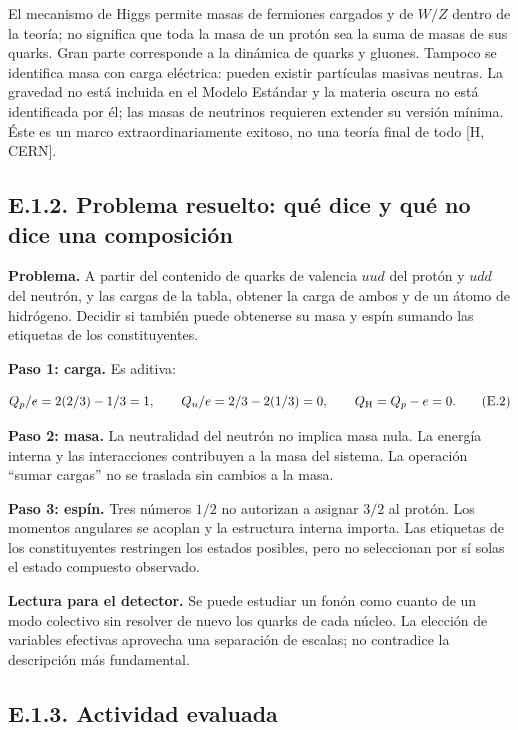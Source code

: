 \documentclass[
  spanish,
  10pt,
  a4paper,
]{article}
\begin{document}
El mecanismo de Higgs permite masas de fermiones cargados y de \(W/Z\)
dentro de la teoría; no significa que toda la masa de un protón sea la
suma de masas de sus quarks. Gran parte corresponde a la dinámica de
quarks y gluones. Tampoco se identifica masa con carga eléctrica: pueden
existir partículas masivas neutras. La gravedad no está incluida en el
Modelo Estándar y la materia oscura no está identificada por él; las
masas de neutrinos requieren extender su versión mínima. Éste es un
marco extraordinariamente exitoso, no una teoría final de todo {[}H,
CERN{]}.

\subsection{E.1.2. Problema resuelto: qué dice y qué no dice una
composición}\label{e.1.2.-problema-resuelto-quuxe9-dice-y-quuxe9-no-dice-una-composiciuxf3n}

\textbf{Problema.} A partir del contenido de quarks de valencia \(uud\)
del protón y \(udd\) del neutrón, y las cargas de la tabla, obtener la
carga de ambos y de un átomo de hidrógeno. Decidir si también puede
obtenerse su masa y espín sumando las etiquetas de los constituyentes.

\textbf{Paso 1: carga.} Es aditiva:

\[
Q_p/e=2(2/3)-1/3=1,\qquad
Q_n/e=2/3-2(1/3)=0,\qquad
Q_{\rm H}=Q_p-e=0.
\tag{E.2}
\]

\textbf{Paso 2: masa.} La neutralidad del neutrón no implica masa nula.
La energía interna y las interacciones contribuyen a la masa del
sistema. La operación ``sumar cargas'' no se traslada sin cambios a la
masa.

\textbf{Paso 3: espín.} Tres números \(1/2\) no autorizan a asignar
\(3/2\) al protón. Los momentos angulares se acoplan y la estructura
interna importa. Las etiquetas de los constituyentes restringen los
estados posibles, pero no seleccionan por sí solas el estado compuesto
observado.

\textbf{Lectura para el detector.} Se puede estudiar un fonón como
cuanto de un modo colectivo sin resolver de nuevo los quarks de cada
núcleo. La elección de variables efectivas aprovecha una separación de
escalas; no contradice la descripción más fundamental.

\subsection{E.1.3. Actividad evaluada}\label{e.1.3.-actividad-evaluada}
\end{document}
